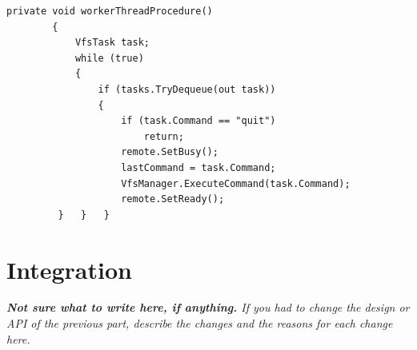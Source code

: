 \documentclass[a4paper,12pt]{article}
\begin{document}
\pagebreak

\begin{lstlisting}[label={lst:3},caption=Worker-Thread's Procedure]
        private void workerThreadProcedure()
        {
            VfsTask task;
            while (true)
            {
                if (tasks.TryDequeue(out task))
                {
                    if (task.Command == "quit")
                        return;
                    remote.SetBusy();
                    lastCommand = task.Command;
                    VfsManager.ExecuteCommand(task.Command);
                    remote.SetReady();
         }   }   }
\end{lstlisting}

\section{Integration}

\emph{\textbf{Not sure what to write here, if anything.} If you had to change the design or API of the previous part, describe the changes and the reasons for each change here.}
\end{document}
